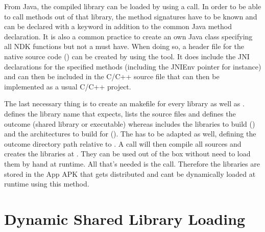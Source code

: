 From Java, the compiled library can be loaded by using a
 call. In order to be able to call methods out 
of that library, the method signatures have to be known and can be declared with 
a  keyword in addition to the common Java method declaration. It is also a 
common practice to create an own Java class specifying all NDK functions but not a must have. When doing so, a header file for the native source code () can be 
created by using the  tool. It does include the JNI declarations for the
specified methods (including the JNIEnv pointer for instance) and can then be included
in the C/C++ source file that can then be implemented as a usual C/C++ project.

The last necessary thing is to create an  makefile for every library as well as .  defines the library name that  expects, lists the source files and defines the outcome (shared library or executable) whereas  includes
the libraries to build () and the architectures to build for
(). The  has to be adapted as well, defining the
outcome directory path relative to .
A  call will then compile all sources and creates the libraries
at . They can be used out of the box without need to load them by hand
at runtime. All that's needed is the  call. Therefore the libraries
are stored in the App APK that gets distributed and cant be dynamically loaded at runtime using this method. 

\section{Dynamic Shared Library Loading}\label{section:shared_library_loading}